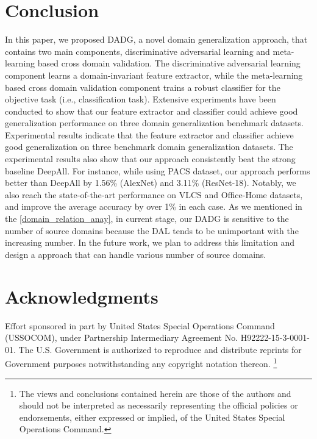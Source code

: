 \documentclass[twocolumn,preprint]{elsarticle}
\begin{document}
\section{Conclusion} \label{section:conclusion}
In this paper, we proposed DADG, a novel domain generalization approach, that contains two main components, discriminative adversarial learning and meta-learning based cross domain validation. The discriminative adversarial learning component learns a domain-invariant feature extractor, while the meta-learning based cross domain validation component trains a robust classifier for the objective task (i.e., classification task). 
Extensive experiments have been conducted to show that our feature extractor and classifier could achieve good generalization performance on three domain generalization benchmark datasets. 
Experimental results indicate that the feature extractor and classifier achieve good generalization on three benchmark domain generalization datasets. 
The experimental results also show that our approach consistently beat the strong baseline DeepAll. For instance, while using PACS dataset, our approach performs better than DeepAll by 1.56\% (AlexNet) and 3.11\% (ResNet-18). Notably, we also reach the state-of-the-art performance on VLCS and Office-Home datasets, and improve the average accuracy by over 1\% in each case. 
As we mentioned in the \ref{domain_relation_anay}, in current stage, our DADG is sensitive to the number of source domains because the DAL tends to be unimportant with the increasing number. In the future work, we plan to address this limitation and design a approach that can handle various number of source domains.





\section*{Acknowledgments} Effort sponsored in part by United States Special Operations Command (USSOCOM), under Partnership Intermediary Agreement No. H92222-15-3-0001-01. The U.S. Government is authorized to reproduce and distribute reprints for Government purposes notwithstanding any copyright notation thereon. \footnote{The views and conclusions contained herein are those of the authors and should not be interpreted as necessarily representing the official policies or endorsements, either expressed or implied, of the United States Special Operations Command.}



\end{document}
